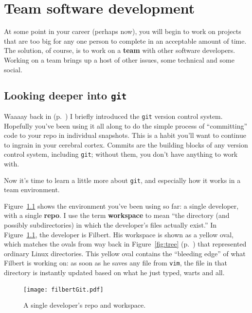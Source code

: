 
\chapter{Team software development}

At some point in your career (perhaps now), you will begin to work on projects
that are too big for any one person to complete in an acceptable amount of
time. The solution, of course, is to work on a \textbf{team} with other
software developers. Working on a team brings up a host of other issues, some
technical and some social.

\section{Looking deeper into \texttt{git}}

Waaaay back in  (p.~\pageref{introduceGit}) I briefly
introduced the \texttt{git} version control system. Hopefully you've been
using it all along to do the simple process of ``committing'' code to your
repo in individual snapshots. This is a habit you'll want to continue to
ingrain in your cerebral cortex. Commits are the building blocks of any
version control system, including \texttt{git}; without them, you don't have
anything to work with.

Now it's time to learn a little more about \texttt{git}, and especially how it
works in a team environment.

Figure~\ref{fig:filbertGit} shows the environment you've been using so far: a
single developer, with a single \textbf{repo}. I use the term
\textbf{workspace} to mean ``the directory (and possibly subdirectories) in
which the developer's files actually exist.'' In Figure~\ref{fig:filbertGit},
the developer is Filbert. His workspace is shown as a yellow oval, which
matches the ovals from way back in Figure~\ref{fig:tree}
(p.~\pageref{fig:tree}) that represented ordinary Linux directories. This
yellow oval contains the ``bleeding edge'' of what Filbert is working on: as
soon as he saves any file from \texttt{vim}, the file in that directory is
instantly updated based on what he just typed, warts and all.

\begin{figure}[ht]
\centering
\texttt{[image: filbertGit.pdf]}
\caption{A single developer's repo and workspace.}
\label{fig:filbertGit}
\end{figure}

